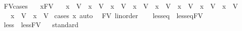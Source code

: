 \begin{isabellebody}
\isanewline
{}\isamarkupfalse%
\ FV{\isacharunderscore}{\kern0pt}cases{\isacharcolon}{\kern0pt}\isanewline
\ \ \ x{\isacharcolon}{\kern0pt}{\isacharcolon}{\kern0pt}FV\isanewline
\ \ \ {\isachardoublequoteopen}x\ {\isacharequal}{\kern0pt}\ V{}{\isachardoublequoteclose}\ {\isacharbar}{\kern0pt}\ {\isachardoublequoteopen}x\ {\isacharequal}{\kern0pt}\ V{}{\isachardoublequoteclose}\ {\isacharbar}{\kern0pt}\ {\isachardoublequoteopen}x\ {\isacharequal}{\kern0pt}\ V{}{\isachardoublequoteclose}\ {\isacharbar}{\kern0pt}\ {\isachardoublequoteopen}x\ {\isacharequal}{\kern0pt}\ V{}{\isachardoublequoteclose}\ {\isacharbar}{\kern0pt}\ {\isachardoublequoteopen}x\ {\isacharequal}{\kern0pt}\ V{}{\isachardoublequoteclose}\ {\isacharbar}{\kern0pt}\ {\isachardoublequoteopen}x\ {\isacharequal}{\kern0pt}\ V{}{\isachardoublequoteclose}\ {\isacharbar}{\kern0pt}\ {\isachardoublequoteopen}x\ {\isacharequal}{\kern0pt}\ V{}{\isachardoublequoteclose}\ {\isacharbar}{\kern0pt}\ {\isachardoublequoteopen}x\ {\isacharequal}{\kern0pt}\ V{}{\isachardoublequoteclose}\ \isanewline
\ \ {\isacharbar}{\kern0pt}\ {\isachardoublequoteopen}x\ {\isacharequal}{\kern0pt}\ V{}{\isachardoublequoteclose}\ {\isacharbar}{\kern0pt}\ {\isachardoublequoteopen}x\ {\isacharequal}{\kern0pt}\ V{}{}{\isachardoublequoteclose}\ \isanewline
%
\isadelimproof
%
\endisadelimproof
%
\isatagproof
{}\isamarkupfalse%
{\isacharparenleft}{\kern0pt}cases\ x{\isacharcomma}{\kern0pt}\ auto{\isacharparenright}{\kern0pt}\ \isamarkupfalse%
%
\endisatagproof
{\isafoldproof}%
%
\isadelimproof
\isanewline
%
\endisadelimproof
\isanewline
{}\isamarkupfalse%
\ FV\ {\isacharcolon}{\kern0pt}{\isacharcolon}{\kern0pt}linorder\ \isanewline
{}\ \isanewline
{}\isamarkupfalse%
\ {\isachardoublequoteopen}less{\isacharunderscore}{\kern0pt}eq\ {\isasymequiv}\ less{\isacharunderscore}{\kern0pt}eq{\isacharunderscore}{\kern0pt}FV{\isachardoublequoteclose}\ \isanewline
{}\isamarkupfalse%
\ {\isachardoublequoteopen}less\ {\isasymequiv}\ less{\isacharunderscore}{\kern0pt}FV{\isachardoublequoteclose}\ \isanewline
\isanewline
{}\isamarkupfalse%
\ \isanewline
%
\isadelimproof
%
\endisadelimproof
%
\isatagproof
{}\isamarkupfalse%
{\isacharparenleft}{\kern0pt}standard{\isacharparenright}{\kern0pt}\isanewline
\ \ \isamarkupfalse%

\end{isabellebody}
